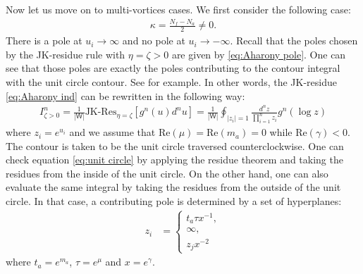 \documentclass[a4paper,11pt]{article}
\begin{document}
Now let us move on to multi-vortices cases. We first consider the following case:
\begin{align}
\kappa = \frac{N_f-N_a}{2} \neq 0.
\end{align}
There is a pole at $u_i \rightarrow \infty$ and no pole at $u_i \rightarrow -\infty$. Recall that the poles chosen by the JK-residue rule with $\eta = \zeta > 0$ are given by \eqref{eq:Aharony pole}. One can see that those poles are exactly the poles contributing to the contour integral with the unit circle contour. See \cite{Hwang:2015wna} for example. In other words, the JK-residue \eqref{eq:Aharony ind} can be rewritten in the following way:
\begin{align}
\label{eq:unit circle}
I^n_{\zeta > 0} = \frac{1}{|\mathsf W|} \text{JK-Res}_{\eta = \zeta} \left[g^n(u) d^n u\right] = \frac{1}{|\mathsf W|} \oint_{|z_i| = 1} \frac{d^n z}{\prod_{i = 1}^n z_i} g^n(\log z)
\end{align}
where $z_i = e^{u_i}$ and we assume that $\mathrm{Re} (\mu) = \mathrm{Re} (m_a) = 0$ while $\mathrm{Re} (\gamma) < 0$. The contour is taken to be the unit circle traversed counterclockwise. One can check equation \eqref{eq:unit circle} by applying the residue theorem and taking the residues from the inside of the unit circle. On the other hand, one can also evaluate the same integral by taking the residues from the outside of the unit circle. In that case, a contributing pole is determined by a set of hyperplanes:
\begin{align}
\label{eq:hyperplanes0}
z_i &= \left\{\begin{array}{l}
t_a \tau x^{-1}, \\
\infty, \\
z_j x^{-2}
\end{array}\right.
\end{align}
where $t_a = e^{m_a}$, $\tau = e^\mu$ and $x = e^\gamma$.
\end{document}
